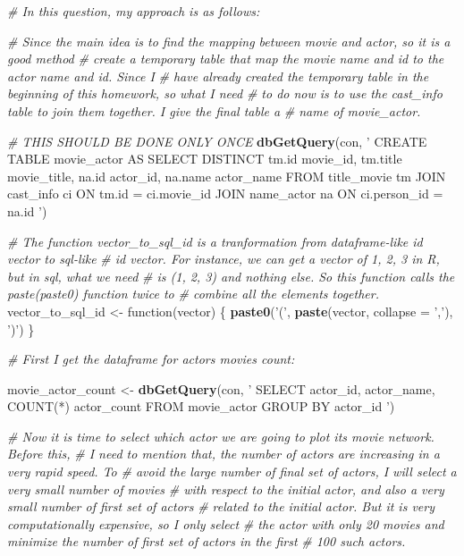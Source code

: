 \documentclass[]{article}
\newenvironment{Shaded}{\begin{snugshade}}{\end{snugshade}}
\newcommand{\KeywordTok}[1]{\textcolor[rgb]{0.13,0.29,0.53}{\textbf{{#1}}}}
\newcommand{\DataTypeTok}[1]{\textcolor[rgb]{0.13,0.29,0.53}{{#1}}}
\newcommand{\StringTok}[1]{\textcolor[rgb]{0.31,0.60,0.02}{{#1}}}
\newcommand{\CommentTok}[1]{\textcolor[rgb]{0.56,0.35,0.01}{\textit{{#1}}}}
\newcommand{\NormalTok}[1]{{#1}}
\begin{document}
\begin{Shaded}
\begin{Highlighting}[]
\CommentTok{# In this question, my approach is as follows:}

\CommentTok{# Since the main idea is to find the mapping between movie and actor, so it is a good method}
\CommentTok{# create a temporary table that map the movie name and id to the actor name and id. Since I}
\CommentTok{# have already created the temporary table in the beginning of this homework, so what I need}
\CommentTok{# to do now is to use the cast_info table to join them together. I give the final table a}
\CommentTok{# name of movie_actor.}

\CommentTok{# THIS SHOULD BE DONE ONLY ONCE}
\KeywordTok{dbGetQuery}\NormalTok{(con, }\StringTok{'}
\StringTok{           CREATE TABLE movie_actor AS}
\StringTok{           SELECT DISTINCT tm.id movie_id, tm.title movie_title, }
\StringTok{           na.id actor_id, na.name actor_name}
\StringTok{           FROM title_movie tm JOIN cast_info ci ON tm.id = ci.movie_id}
\StringTok{           JOIN name_actor na ON ci.person_id = na.id}
\StringTok{           '}\NormalTok{)}

\CommentTok{# The function vector_to_sql_id is a tranformation from dataframe-like id vector to sql-like}
\CommentTok{# id vector. For instance, we can get a vector of 1, 2, 3 in R, but in sql, what we need}
\CommentTok{# is (1, 2, 3) and nothing else. So this function calls the paste(paste0) function twice to}
\CommentTok{# combine all the elements together.}
\NormalTok{vector_to_sql_id <-}\StringTok{ }\NormalTok{function(vector) \{}
  \KeywordTok{paste0}\NormalTok{(}\StringTok{'('}\NormalTok{, }\KeywordTok{paste}\NormalTok{(vector, }\DataTypeTok{collapse =} \StringTok{','}\NormalTok{), }\StringTok{')'}\NormalTok{)}
\NormalTok{\}}

\CommentTok{# First I get the dataframe for actors movies count:}

\NormalTok{movie_actor_count <-}\StringTok{ }
\StringTok{  }\KeywordTok{dbGetQuery}\NormalTok{(con, }\StringTok{'}
\StringTok{             SELECT actor_id, actor_name, COUNT(*) actor_count}
\StringTok{             FROM movie_actor}
\StringTok{             GROUP BY actor_id}
\StringTok{             '}\NormalTok{)}

\CommentTok{# Now it is time to select which actor we are going to plot its movie network. Before this,}
\CommentTok{# I need to mention that, the number of actors are increasing in a very rapid speed. To}
\CommentTok{# avoid the large number of final set of actors, I will select a very small number of movies}
\CommentTok{# with respect to the initial actor,  and also a very small number of first set of actors }
\CommentTok{# related to the initial actor. But it is very computationally expensive, so I only select}
\CommentTok{# the actor with only 20 movies and minimize the number of first set of actors in the first}
\CommentTok{# 100 such actors.}


\end{Highlighting}
\end{Shaded}
\end{document}
